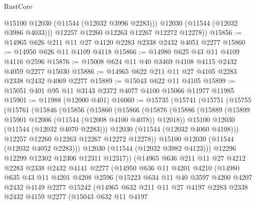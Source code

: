\begin{lexlean}{RustCore}
\begin{coremodule}
            @15100
            @12030
            (@11544 (@12032 @3996 @2283)))
          @12030
          (@11544 (@12032 @3986 @4033)))
        @12257
        @12260
        @12263
        @12267
        @12272
        @12278))
@15856 := @14965 @626 @211 @11 @27 @4120 @2283 @2338 @2432 @4051 @2277
@15860 := @14950 @626 @11 @4109 @4118
@15866 := @14980 @625 @43 @11 @4109 @4116 @2596
@15876 := @15008 @624 @11 @40 @3469 @4108 @4115 @2432 @4059 @2277 @15030
@15886 := @14965 @622 @211 @11 @27 @4105 @2283 @2338 @2432 @4069 @2277
@15889 := @15043 @622 @11 @4105
@15899 := @15051 @401 @95 @11 @3143 @2372 @4077 @4100 @15066 @11977 @11985
@15901 := @11988 (@12000 @401)
@16060 := @15735
    (@15741
      (@15751
        (@15755
          (@15761
            (@15846
              (@15856
                (@15860
                  (@15866
                    (@15876
                      (@15886
                        (@15889 (@15899 @15901 @12006 (@11544 (@12008 @4100 @4078)) @12018))
                        @15100
                        @12030
                        (@11544 (@12032 @4070 @2283)))
                      @12030
                      (@11544 (@12032 @4060 @4108)))
                    @12257
                    @12260
                    @12263
                    @12267
                    @12272
                    @12278))
                @15100
                @12030
                (@11544 (@12032 @4052 @2283)))
              @12030
              (@11544 (@12032 @3982 @4123)))
            @12296
            @12299
            @12302
            @12306
            @12311
            @12317))
        (@14965
          @636
          @211
          @11
          @27
          @4212
          @2283
          @2338
          @2432
          @4141
          @2277
          (@14950
            @636
            @11
            @4201
            @4210
            (@14980
              @635
              @43
              @11
              @4201
              @4208
              @2596
              (@15223
                @634
                @11
                @40
                @3597
                @4200
                @4207
                @2432
                @4149
                @2277
                @15242
                (@14965
                  @632
                  @211
                  @11
                  @27
                  @4197
                  @2283
                  @2338
                  @2432
                  @4159
                  @2277
                  (@15043
                    @632
                    @11
                    @4197

\end{coremodule}
\end{lexlean}

